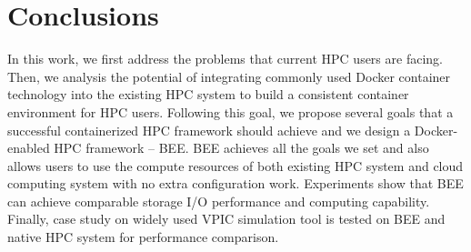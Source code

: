 \section{Conclusions}
    \label{sec:conclusions}
In this work, we first address the problems that current HPC users are facing. Then, we analysis the potential of integrating commonly used Docker container technology into the existing HPC system to build a consistent container environment for HPC users. Following this goal, we propose several goals that a successful containerized HPC framework should achieve and we design a Docker-enabled HPC framework -- BEE. BEE achieves all the goals we set and also allows users to use the compute resources of both existing HPC system and cloud computing system with no extra configuration work.
Experiments show that BEE can achieve comparable storage I/O performance and computing capability. Finally, case study on widely used VPIC simulation tool is tested on BEE and native HPC system for performance comparison. 
